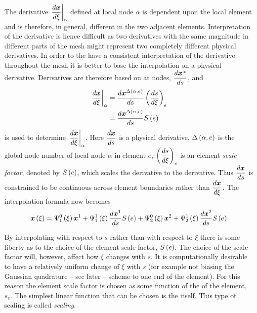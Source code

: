 The derivative $\evalat{\dby{\vect{x}}{\xi}}{\alpha}$ defined at local node
$\alpha$ is dependent upon the local element \xicoord and is therefore, in
general, different in the two adjacent elements. Interpretation of the
derivative is hence difficult as two derivatives with the same magnitude in
different parts of the mesh might represent two completely different physical
derivatives. In order to the have a consistent interpretation of the derivative
throughout the mesh it is better to base the interpolation on a physical
derivative. Derivatives are therefore based on \arclen at nodes,
$\dby{\nodept{\vect{x}}{\alpha}}{s}$, and
\begin{equation}
  \begin{split}
    \evalat{\dby{\vect{x}}{\xi}}{\alpha}&=\dby{\nodept{\vect{x}}{
        \fnof{\Delta}{\alpha,e}}}{s}\pbrac{\dby{s}{\xi}}_{e} \\ &=
    \dby{\nodept{\vect{x}}{\fnof{\Delta}{\alpha,e}}}{s}\esfone{e}
  \end{split}
  \label{eqn:xitosch}
\end{equation}
is used to determine $\evalat{\dby{\vect{x}}{\xi}}{\alpha}$. Here
$\dby{\vect{x}}{s}$ is a physical \arclen derivative,
$ \Delta\left( \alpha,e \right) $ is the global node number of local node $\alpha$ in
element $e$, $\left(  \dfrac{ d s}{d \xi}  \right)_{e}$ is an element \emph{scale factor}, denoted by $   S \left( {e} \right)  $, which scales
the \arclen derivative to the \xicoord derivative.  Thus $\dby{\vect{x}}{s}$
is constrained to be continuous across element boundaries rather than
$\dby{\vect{x}}{\xi}$. The \cubicherm interpolation formula now becomes
\begin{equation}
  \fnof{\vect{x}}{\xi}=\chbfn{1}{0}{\xi}\nodept{\vect{x}}{1}+\chbfn{1}{1}{\xi}
  \dby{\nodept{\vect{x}}{1}}{s}\esfone{e}+\chbfn{2}{0}{\xi}\nodept{\vect{x}}{2}+
  \chbfn{2}{1}{\xi}\dby{\nodept{\vect{x}}{2}}{s}\esfone{e}
  \label{eqn:chseinterpolation}
\end{equation}

By interpolating with respect to $s$ rather than with respect to $\xi$ there is some
liberty as to the choice of the element scale factor, $   S \left( {e} \right)  $. The choice
of the scale factor will, however, affect how $\xi$ changes with $s$.  It is
computationally desirable to have a relatively uniform change of $\xi$ with
$s$ (for example not biasing the Gaussian quadrature -- see later -- scheme to
one end of the element). For this reason the element scale factor is chosen as
some function of the \arclen of the element, $s_{e}$. The simplest linear
function that can be chosen is the \arclen itself. This type of scaling is
called \emph{\arclen scaling}.

